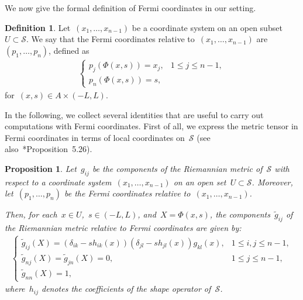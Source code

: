 \documentclass[12pt,a4paper]{amsart}
\numberwithin{equation}{section}
\newtheorem{proposition}[theorem]{Proposition}
\theoremstyle{definition}
\newtheorem{definition}[theorem]{Definition}
\theoremstyle{remark}
\renewcommand{\leq}{\leqslant}
\begin{document}
\begin{appendix}
We now give the formal definition of Fermi coordinates in our setting.

\begin{definition}
    Let~$(x_1,\dots,x_{n-1})$ be a coordinate system on an open subset~$U\subset\mathcal{S}$. We say that the Fermi coordinates relative to~$(x_1,\dots,x_{n-1})$ are~$(p_1,\dots,p_n)$, defined as
    \begin{align}\label{EQ::FermiCoordinatesDefinition}
        \begin{cases}
            p_j(\Phi(x,s)) = x_j,&1\leq j\leq n-1,\\
            p_n(\Phi(x,s)) = s,&
        \end{cases}
    \end{align}
    for~$(x,s) \in A \times (-L, L)$.
\end{definition}

In the following, we collect several identities that are useful to carry out computations with Fermi coordinates. First of all, we express the metric tensor in Fermi coordinates in terms of local coordinates on~$\mathcal{S}$ (see also~\cite{MR3887684}*{Proposition~5.26}).

\begin{proposition}
    Let~$g_{ij}$ be the components of the Riemannian metric of~$\mathcal{S}$ with respect to a coordinate system~$(x_1,\dots,x_{n-1})$ on an open set~$U \subset \mathcal{S}$. Moreover, let~$(p_1,\dots,p_n)$ be the Fermi coordinates relative to~$(x_1,\dots,x_{n-1})$.
    
    Then, for each~$x \in U$,~$s \in (-L,L)$, and~$X = \Phi(x,s)$, the components~$\tilde{g}_{ij}$ of the Riemannian metric relative to Fermi coordinates are given by:
    \begin{align}\label{EQ::FermiCoordinatesMetric}
        \begin{cases}
            \tilde{g}_{ij}(X) = \left(\delta_{ik} - s h_{ik}(x)\right) \left(\delta_{jl} - s h_{jl}(x)\right) g_{kl}(x),&1\leq i,j \leq n-1,\\
            \tilde{g}_{nj}(X) = \tilde{g}_{jn}(X) = 0,&1\leq j \leq n-1,\\
            \tilde{g}_{nn}(X) = 1,
        \end{cases}
    \end{align}
    where~$h_{ij}$ denotes the coefficients of the shape operator of~$\mathcal{S}$.
\end{proposition}


\end{appendix}
\end{document}
